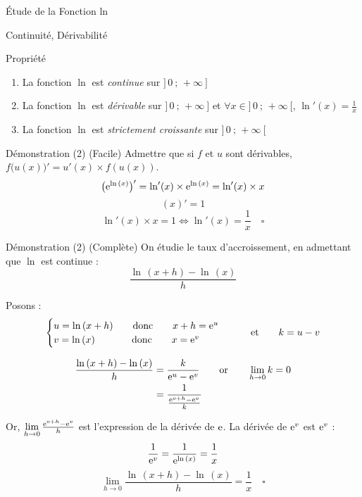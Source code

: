 \documentclass{cours}
\begin{document}
    \begin{Gpartie}{Étude de la Fonction ln}
        \begin{Spartie}{Continuité, Dérivabilité}
            \begin{SSpartie}{Propriété}
                \begin{enumerate}[(1)]
                    \item La fonction $\ln$ est \emph{continue} sur $\big]\,0~;\,+\infty~\big]$
                    \item La fonction $\ln$ est \emph{dérivable} sur $\big]\,0~;\,+\infty~\big]$ et $\forall x\in\big]\,0~;\,+\infty~\big[$, $\boxed{\ln'(x)=\frac{1}{x}}$
                    \item La fonction $\ln$ est \emph{strictement croissante} sur $\big]\,0~;\,+\infty~\big[$
                \end{enumerate}
                \begin{SSSpartie}{Démonstration (2) (Facile)}
                    Admettre que si $f$ et $u$ sont dérivables, $f\big(u(x)\big)'=u'(x)\times f(u(x))$.
                    \[\big(\mathrm{e}^{\ln\,(x)}\big)'=\ln'(x)\times \mathrm{e}^{\ln\,(x)}=\ln'(x)\times x\]
                    \[(x)'=1\]
                    \[\ln'(x)\times x=1\iff\ln'(x)=\frac{1}{x}\quad\square\]
                    
                \end{SSSpartie}
                \begin{SSSpartie}{Démonstration (2) (Complète)} 
                    On étudie le taux d'accroissement, en admettant que $\ln$ est continue :
                    \[\frac{\ln\,(x+h)-\ln\,(x)}{h}\]

                    Posons :
                    \[\begin{cases}
                        u=\ln\,(x+h)\qquad\text{donc}\qquad x+h=\mathrm{e}^u \\ v=\ln\,(x)\phantom{+h)}\text{\qquad donc\qquad} x=\mathrm{e}^v
                    \end{cases}\qquad\text{et}\qquad k=u-v\]

                    \[\begin{aligned}[t]
                        \frac{\ln\,(x+h)-\ln\,(x)}{h}&=\frac{k}{\mathrm{e}^u-\mathrm{e}^v}\qquad\text{or}\qquad\lim_{h\to0}k=0 \\
                        &=\frac{1}{\frac{\mathrm{e}^{v+h}-\mathrm{e}^v}{k}}
                    \end{aligned}\]

                    Or, $\lim\limits_{h\to0}\frac{\mathrm{e}^{v+h}-\mathrm{e}^v}{h}$ est l'expression de la dérivée de $\mathrm{e}$. La dérivée de $\mathrm{e}^v$ est $\mathrm{e}^v$ :
                    \[\frac{1}{\mathrm{e}^v}=\frac{1}{\mathrm{e}^{\ln\,(x)}}=\frac{1}{x}\]
                    \[\lim\limits_{h\to 0}\frac{\ln\,(x+h)-\ln\,(x)}{h}=\frac{1}{x}\quad\square\]


\end{SSSpartie}
\end{SSpartie}
\end{Spartie}
\end{Gpartie}
\end{document}
